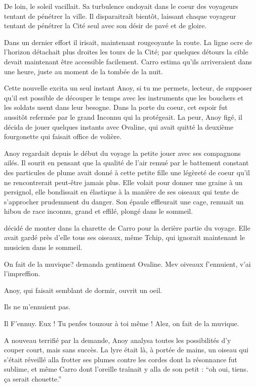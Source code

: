 De loin, le soleil vacillait. Sa turbulence ondoyait dans le coeur des
voyageurs tentant de pénétrer la ville. Il disparaitraît bientôt,
laissant chaque voyageur tentant de pénétrer la Cité seul avec son
désir de pavé et de gloire.

Dans un dernier effort il irisait, maintenant rougeoyante la route. La
ligne ocre de l'horizon détachait plus droites les tours de la Cité;
par quelques détours la cible devait maintenant être accessible
facilement. Carro estima qu'ils arriveraient dans une heure, juste au
moment de la tombée de la nuit.

Cette nouvelle excita un seul instant Anoy, si tu me permets, lecteur,
de supposer qu'il est possible de découper le temps avec les
instruments que les bouchers et les soldats usent dans leur besogne.
Dans la porte du coeur, cet espoir fut aussitôt refermée par le grand
Inconnu qui la protégeait. La peur, Anoy figé, il décida de jouer quelques
instants avec Ovaline, qui avait quitté la deuxième fourgonette qui
faisait office de volière.

Anoy regardait depuis le début du voyage la petite jouer avec ses
compagnons ailés. Il sourit en pensant que la qualité de l'air remué
par le battement constant des particules de plume avait donné à cette
petite fille une légèreté de coeur qu'il ne rencontrerait peut-être
jamais plus. Elle volait pour donner une graine à un persignol, elle
bondissait en élastique à la manière de ses oiseaux qui tente de
s'approcher prudemment du danger. Son épaule effleurait une cage,
remuait un hibou de race inconnu, grand et effilé, plongé dans le
sommeil.

décidé de monter dans la charette de Carro pour la derière partie du
voyage. Elle avait gardé près d'elle tous ses oiseaux, même Tchip, qui
ignorait maintenant le musicien dans le sommeil.

On fait de la muvique? demanda gentiment Ovaline. Mev oiveaux
f'ennuient, v'ai l'impreffion.

Anoy, qui faisait semblant de dormir, ouvrit un oeil.

Ils ne m'ennuient pas.

Il F'ennuy. Eux ! Tu penfes touzour à toi même ! Alez, on fait de la
muvique.

A nouveau terrifié par la demande, Anoy analysa toutes les
possibilités d'y couper court, mais sans succès. La lyre était là, à
portée de mains, un oiseau qui s'était réveillé alla frotter ses
plumes contre les cordes dont la résonnance fut sublime, et même Carro
dont l'oreille traînait y alla de son petit : ``oh oui, tiens. ça
serait chouette.''

